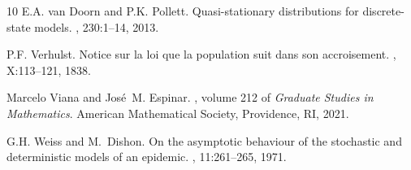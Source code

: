 \documentclass[12pt]{article}
\begin{document}
\begin{thebibliography}{10}
E.A. van Doorn and P.K. Pollett.
\newblock Quasi-stationary distributions for discrete-state models.
, 230:1--14, 2013.

P.F. Verhulst.
\newblock Notice sur la loi que la population suit dans son accroisement.
, X:113--121, 1838.

Marcelo Viana and Jos{\'e}~M. Espinar.
, volume 212 of {\em Graduate Studies in Mathematics}.
\newblock American Mathematical Society, Providence, RI, 2021.

G.H. Weiss and M.~Dishon.
\newblock On the asymptotic behaviour of the stochastic and deterministic
  models of an epidemic.
, 11:261--265, 1971.

\end{thebibliography}
\end{document}
